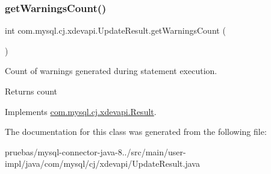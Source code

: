\subsubsection{\texorpdfstring{get\+Warnings\+Count()}{getWarningsCount()}}
{\footnotesize\ttfamily int com.\+mysql.\+cj.\+xdevapi.\+Update\+Result.\+get\+Warnings\+Count (\begin{DoxyParamCaption}{ }\end{DoxyParamCaption})}

Count of warnings generated during statement execution.

\begin{DoxyReturn}{Returns}
count 
\end{DoxyReturn}


Implements \mbox{\hyperlink{interfacecom_1_1mysql_1_1cj_1_1xdevapi_1_1_result_addd5c82af4ab35e702d7f2961119ecc6}{com.\+mysql.\+cj.\+xdevapi.\+Result}}.



The documentation for this class was generated from the following file\+:\begin{DoxyCompactItemize}
\item 
pruebas/mysql-\/connector-\/java-\/8../src/main/user-\/impl/java/com/mysql/cj/xdevapi/Update\+Result.\+java\end{DoxyCompactItemize}
